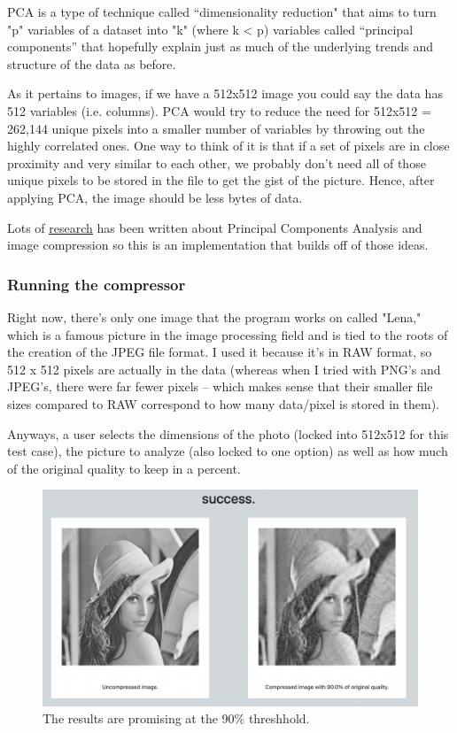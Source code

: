 \documentclass[10pt]{article}
\begin{document}
\begin{multicols*}{2}
PCA is a type of technique called ``dimensionality reduction" that aims to turn "p" variables of a dataset into "k" (where k < p) variables called ``principal components'' that hopefully explain just as much of the underlying trends and structure of the data as before. 

As it pertains to images, if we have a 512x512 image you could say the data has 512 variables (i.e. columns). PCA would try to reduce the need for 512x512 = 262,144 unique pixels into a smaller number of variables by throwing out the highly correlated ones. One way to think of it is that if a set of pixels are in close proximity and very similar to each other, we probably don't need all of those unique pixels to be stored in the file to get the gist of the picture. Hence, after applying PCA, the image should be less bytes of data. 

Lots of \underline{\href{https://towardsdatascience.com/image-compression-using-principal-component-analysis-pca-253f26740a9f}{research}} has been written about Principal Components Analysis and image compression so this is an implementation that builds off of those ideas. 

\subsubsection{Running the compressor}

Right now, there's only one image that the program works on called "Lena," which is a famous picture in the image processing field and is tied to the roots of the creation of the JPEG file format. I used it because it's in RAW format, so 512 x 512 pixels are actually in the data (whereas when I tried with PNG's and JPEG's, there were far fewer pixels -- which makes sense that their smaller file sizes compared to RAW correspond to how many data/pixel is stored in them).

Anyways, a user selects the dimensions of the photo (locked into 512x512 for this test case), the picture to analyze (also locked to one option) as well as how much of the original quality to keep in a percent. 

    \begin{figure}[H]
        \centering
    	\includegraphics[width=\columnwidth]{compressed.png}
    	\caption{The results are promising at the 90\% threshhold.}
    	\label{fig:fig6}
    \end{figure}


\end{multicols*}
\end{document}
